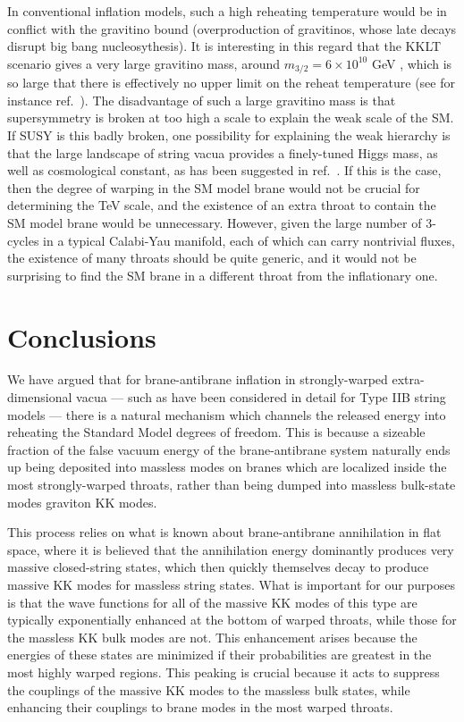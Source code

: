 \documentclass[12pt]{JHEP3}
\begin{document}
In conventional inflation models, such a high reheating temperature would
be in conflict with the gravitino bound (overproduction of gravitinos,
whose late decays disrupt big bang nucleosythesis).  It is interesting in
this regard that the KKLT scenario gives a very large gravitino mass,
around $m_{3/2} =  6\times 10^{10}$ GeV \cite{RA}, which is so large that
there is effectively no upper limit on the reheat temperature (see for
instance ref.\ \cite{KKM}).  The disadvantage of such a large gravitino
mass is that supersymmetry is broken at too high a scale to explain the
weak scale of the SM. If SUSY is this badly broken, one possibility for
explaining the weak hierarchy is that the large landscape of string vacua
provides a finely-tuned Higgs mass, as well as cosmological constant, as
has been suggested in ref.\ \cite{splitsusy}.  If this is the case, then
the degree of warping in the SM model brane would not be crucial for
determining the TeV scale, and the existence of an extra throat to
contain the SM model brane would be unnecessary.  However, given the
large number of 3-cycles in a typical Calabi-Yau manifold,  each of which
can carry nontrivial fluxes, the existence of many throats should be
quite generic, and it would not be surprising to find the SM brane in a
different throat from the inflationary one.


\section{Conclusions}

We have argued that for brane-antibrane inflation in
strongly-warped extra-dimensional vacua --- such as have been
considered in detail for Type IIB string models --- there is a
natural mechanism which channels the released energy into
reheating the Standard Model degrees of freedom. This is because a
sizeable fraction of the false vacuum energy of the
brane-antibrane system naturally ends up being deposited into
massless modes on branes which are localized inside the most
strongly-warped throats, rather than being dumped into massless
bulk-state modes graviton KK modes.

This process relies on what is known about brane-antibrane
annihilation in flat space, where it is believed that the
annihilation energy dominantly produces very massive closed-string
states, which then quickly themselves decay to produce massive KK
modes for massless string states. What is important for our
purposes is that the wave functions for all of the massive KK
modes of this type are typically exponentially enhanced at the
bottom of warped throats, while those for the massless KK bulk
modes are not. This enhancement arises because the energies of
these states are minimized if their probabilities are greatest in
the most highly warped regions. This peaking is crucial because it
acts to suppress the couplings of the massive KK modes to the
massless bulk states, while enhancing their couplings to brane
modes in the most warped throats.
\end{document}
